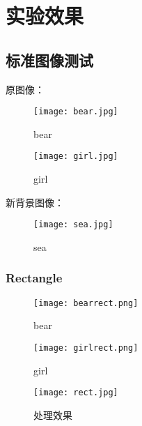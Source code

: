 \documentclass[14pt]{scrartcl} %
\begin{document}
\section{实验效果}

\subsection{标准图像测试}

原图像：

\begin{figure}[h] %
	\begin{minipage}[t]{0.5\linewidth}
		\centering
		\texttt{[image: bear.jpg]}
		\caption{bear}
	\end{minipage}%
	\begin{minipage}[t]{0.5\linewidth}
		\centering
		\texttt{[image: girl.jpg]}
		\caption{girl}
	\end{minipage}
\end{figure}

新背景图像：

\begin{figure}[h] %
	\centering
	\texttt{[image: sea.jpg]} %
	\caption{sea}
\end{figure}

\pagebreak
\subsubsection{Rectangle}

\begin{figure}[h] %
	\begin{minipage}[t]{0.5\linewidth}
		\centering
		\texttt{[image: bearrect.png]}
		\caption{bear}
	\end{minipage}%
	\begin{minipage}[t]{0.5\linewidth}
		\centering
		\texttt{[image: girlrect.png]}
		\caption{girl}
	\end{minipage}
\end{figure}

\begin{figure}[h] %
	\centering
	\texttt{[image: rect.jpg]} %
	\caption{处理效果}
\end{figure}
\end{document}
